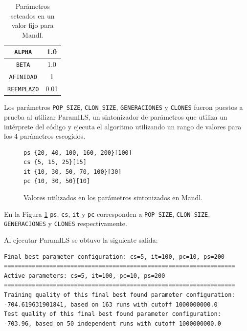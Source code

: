 \begin{table}[!htb]
\begin{center}
\begin{tabular}{|c|c|}
\hline
\texttt{ALPHA} & 1.0\\ \hline
\texttt{BETA} & 1.0\\ \hline
\texttt{AFINIDAD} & 1\\ \hline
\texttt{REEMPLAZO} & 0.01\\ \hline
\end{tabular}
\label{tab:paramfijos}
\caption{Parámetros seteados en un valor fijo para Mandl.}
\end{center}
\end{table}

Los parámetros \texttt{POP\_SIZE}, \texttt{CLON\_SIZE}, \texttt{GENERACIONES} y \texttt{CLONES} fueron puestos a prueba al utilizar ParamILS, un sintonizador de parámetros que utiliza un intérprete del código y ejecuta el algoritmo utilizando un rango de valores para los 4 parámetros escogidos.

\begin{figure}[!htb]
\begin{verbatim}
ps {20, 40, 100, 160, 200}[100]
cs {5, 15, 25}[15]
it {10, 30, 50, 70, 100}[30]
pc {10, 30, 50}[10]
\end{verbatim}
\caption{Valores utilizados en los parámetros sintonizados en Mandl.}
\label{fig:paramsintonizados}
\end{figure}

En la Figura \ref{fig:paramsintonizados} \texttt{ps}, \texttt{cs}, \texttt{it} y \texttt{pc} corresponden a \texttt{POP\_SIZE}, \texttt{CLON\_SIZE}, \texttt{GENERACIONES} y \texttt{CLONES} respectivamente.

\newpage

Al ejecutar ParamILS se obtuvo la siguiente salida:

\begin{small}
\begin{verbatim}
Final best parameter configuration: cs=5, it=100, pc=10, ps=200
==================================================================
Active parameters: cs=5, it=100, pc=10, ps=200
==================================================================
Training quality of this final best found parameter configuration: 
-704.619631901841, based on 163 runs with cutoff 1000000000.0
Test quality of this final best found parameter configuration: 
-703.96, based on 50 independent runs with cutoff 1000000000.0
\end{verbatim}
\end{small}

